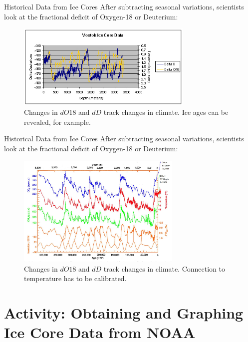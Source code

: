\documentclass{beamer}
\begin{document}
\begin{frame}{Historical Data from Ice Cores}
After subtracting seasonal variations, scientists look at the fractional deficit of Oxygen-18 or Deuterium:
\begin{figure}
\centering
\includegraphics[width=0.75\textwidth]{Vostok_deltaD_deltaO18.jpg}
\caption{\label{fig:vostok} Changes in $dO18$ and $dD$ track changes in climate.  Ice ages can be revealed, for example.}
\end{figure}
\end{frame}

\begin{frame}{Historical Data from Ice Cores}
After subtracting seasonal variations, scientists look at the fractional deficit of Oxygen-18 or Deuterium:
\begin{figure}
\centering
\includegraphics[width=0.7\textwidth]{Vostok2.jpg}
\caption{\label{fig:vostok2} Changes in $dO18$ and $dD$ track changes in climate.  Connection to temperature has to be calibrated.}
\end{figure}
\end{frame}

\section{Activity: Obtaining and Graphing Ice Core Data from NOAA}
\end{document}
